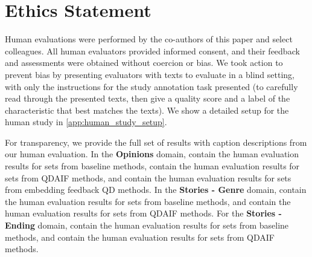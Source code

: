 \section*{Ethics Statement}
Human evaluations were performed by the co-authors of this paper and select colleagues. All human evaluators provided informed consent, and their feedback and assessments were obtained without coercion or bias. We took action to prevent bias by presenting evaluators with texts to evaluate in a blind setting, with only the instructions for the study annotation task presented (to carefully read through the presented texts, then give a quality score and a label of the characteristic that best matches the texts). We show a detailed setup for the human study in \cref{app:human_study_setup}.

For transparency, we provide the full set of results with caption descriptions from our human evaluation. In the \textbf{Opinions} domain,  contain the human evaluation results for sets from baseline methods,  contain the human evaluation results for sets from QDAIF methods, and  contain the human evaluation results for sets from embedding feedback QD methods. In the \textbf{Stories - Genre} domain,  contain the human evaluation results for sets from baseline methods, and  contain the human evaluation results for sets from QDAIF methods. For the \textbf{Stories - Ending} domain,  contain the human evaluation results for sets from baseline methods, and  contain the human evaluation results for sets from QDAIF methods. 


